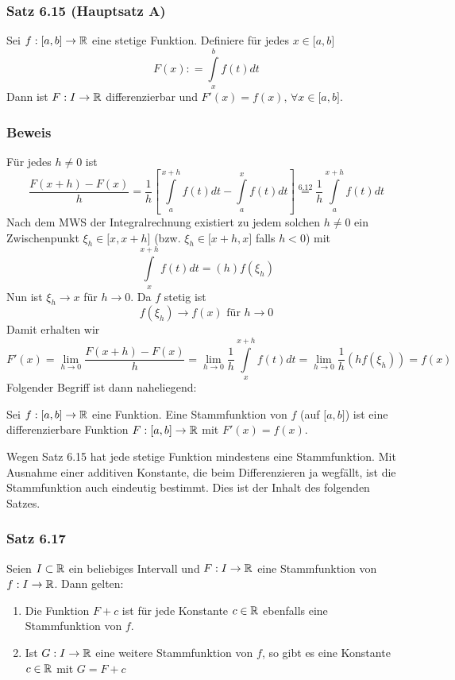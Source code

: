 \subsubsection*{Satz 6.15 (Hauptsatz A)}
Sei $f:\lbrack a,b\rbrack\to\mathbb{R}$ eine stetige Funktion. Definiere für jedes $x\in\lbrack a,b\rbrack$ \[F(x): = \int\limits_x^b {f(t)dt} \]
Dann ist $F:I\to\mathbb{R}$ differenzierbar und $F'(x)=f(x)\text{, }\forall x \in\lbrack a,b\rbrack$.\\
\subsubsection*{Beweis}
Für jedes $h\neq 0$ ist \[\frac{{F(x + h) - F(x)}}{h} = \frac{1}{h}\left[ {\int\limits_a^{x + h} {f(t)dt}  - \int\limits_a^x {f(t)dt} } \right] \mathop  = \limits^{6.12}  \frac{1}{h}\int\limits_a^{x + h} {f(t)dt} \]
Nach dem MWS der Integralrechnung existiert zu jedem solchen $h\neq 0$ ein Zwischenpunkt $\xi_h\in\lbrack x,x+h\rbrack$ (bzw. $\xi_h\in\lbrack x + h,x\rbrack$ falls $h<0$) mit \[\int\limits_x^{x + h} {f(t)dt = (h)f({\xi _h})} \]
Nun ist $\xi_h \to x$ für $h\to 0$. Da $f$ stetig ist \[f(\xi_h)\to f(x) \text{ für } h\to 0\]
Damit erhalten wir \[F'(x) = \mathop {\lim }\limits_{h \to 0} \frac{{F(x + h) - F(x)}}{h} = \mathop {\lim }\limits_{h \to 0} \frac{1}{h}\int\limits_x^{x + h} {f(t)dt = } \mathop {\lim }\limits_{h \to 0} \frac{1}{h}(hf({\xi _h})) = f(x)\]
Folgender Begriff ist dann naheliegend: \\

\begin{definition}{6.16}
 Sei $f:\lbrack a,b\rbrack\to\mathbb{R}$ eine Funktion. Eine Stammfunktion von $f$ (auf $\lbrack a,b\rbrack$) ist eine differenzierbare Funktion $F:\lbrack a,b\rbrack\to\mathbb{R}$ mit $F'(x)=f(x)$.\\
\end{definition}
\noindent Wegen Satz 6.15 hat jede stetige Funktion mindestens eine Stammfunktion. Mit Ausnahme einer additiven Konstante, die beim Differenzieren ja wegfällt, ist die Stammfunktion auch eindeutig bestimmt. Dies ist der Inhalt des folgenden Satzes.\\

\subsubsection*{Satz 6.17}
Seien $I\subset \mathbb{R}$ ein beliebiges Intervall und $F:I\to\mathbb{R}$ eine Stammfunktion von $f:I\to\mathbb{R}$. Dann gelten:
\begin{enumerate}[\indent (a)]
\item Die Funktion $F+c$ ist für jede Konstante $c\in\mathbb{R}$ ebenfalls eine Stammfunktion von $f$.
\item Ist $G:I\to\mathbb{R}$ eine weitere Stammfunktion von $f$, so gibt es eine Konstante $c\in\mathbb{R}$ mit $G=F+c$
\end{enumerate}

